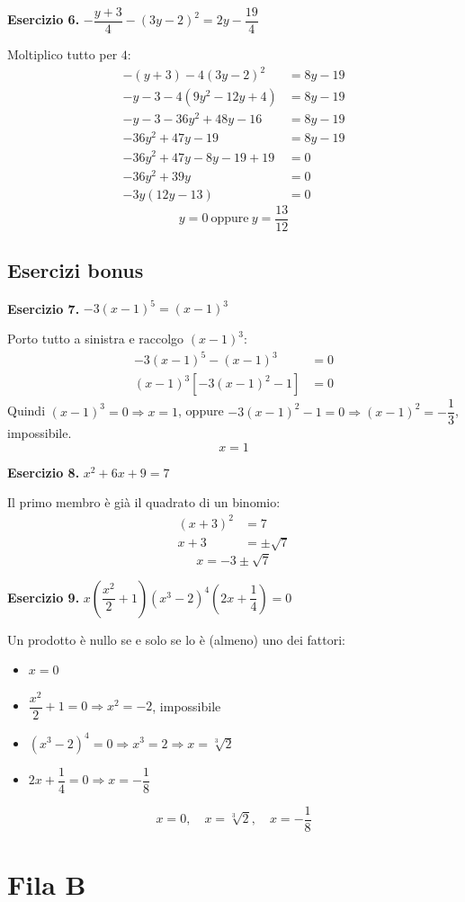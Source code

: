 \documentclass[11pt]{report}
\newcommand{\eserc}[1]{\bigskip\noindent\textbf{Esercizio #1.}\quad}
\begin{document}
\eserc{6} $-\dfrac{y+3}{4} - (3y-2)^2 = 2y - \dfrac{19}{4}$

Moltiplico tutto per $4$:
\begin{align*}
-(y+3) - 4(3y-2)^2 &= 8y-19\\
-y-3-4(9y^2-12y+4) &= 8y-19\\
-y-3-36y^2+48y-16 &= 8y-19\\
-36y^2+47y-19 &= 8y-19\\
-36y^2+47y-8y-19+19 &=0\\
-36y^2+39y &=0\\
-3y(12y-13)&=0
\end{align*}
\[
\boxed{y=0 \ \text{oppure}\ y=\dfrac{13}{12}}
\]

\subsection*{Esercizi bonus}

\eserc{7} $-3(x-1)^5=(x-1)^3$

Porto tutto a sinistra e raccolgo $(x-1)^3$:
\begin{align*}
-3(x-1)^5-(x-1)^3 &=0\\
(x-1)^3\left[-3(x-1)^2-1\right] &=0
\end{align*}
Quindi $(x-1)^3=0 \Rightarrow x=1$, oppure $-3(x-1)^2-1=0 \Rightarrow (x-1)^2=-\dfrac13$, impossibile.
\[
\boxed{x=1}
\]

\eserc{8} $x^2+6x+9=7$

Il primo membro è già il quadrato di un binomio:
\begin{align*}
(x+3)^2 &= 7\\
x+3 &= \pm\sqrt7
\end{align*}
\[
\boxed{x=-3\pm\sqrt7}
\]

\eserc{9} $x\left(\dfrac {x^2}2 +1\right)(x^3-2)^4\left(2x+\dfrac14\right)=0$

Un prodotto è nullo se e solo se lo è (almeno) uno dei fattori:
\begin{itemize}
\item $x=0$
\item $\dfrac{x^2}2+1=0 \Rightarrow x^2=-2$, impossibile
\item $(x^3-2)^4=0 \Rightarrow x^3=2 \Rightarrow x=\sqrt[3]2$
\item $2x+\dfrac14=0 \Rightarrow x=-\dfrac18$
\end{itemize}
\[
\boxed{x=0,\quad x=\sqrt[3]2,\quad x=-\dfrac18}
\]

\clearpage
\section*{Fila B}
\end{document}
